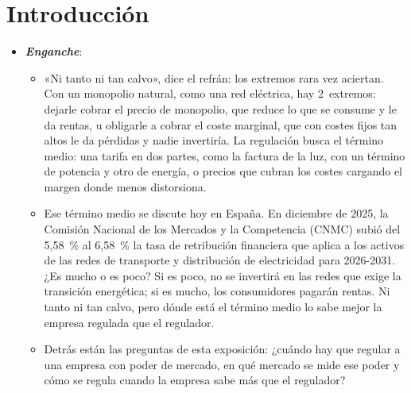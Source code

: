 \documentclass[11pt]{article}
\begin{document}
\tceetitulo

\section*{Introducción}

\begin{itemize}
\item \textbf{\emph{Enganche}}:
  \begin{itemize}
  \item «Ni tanto ni tan calvo», dice el refrán: los extremos rara vez aciertan. Con un monopolio natural, como una red eléctrica, hay 2~extremos: dejarle cobrar el precio de monopolio, que reduce lo que se consume y le da rentas, u obligarle a cobrar el coste marginal, que con costes fijos tan altos le da pérdidas y nadie invertiría. La regulación busca el término medio: una tarifa en dos partes, como la factura de la luz, con un término de potencia y otro de energía, o precios que cubran los costes cargando el margen donde menos distorsiona.
  \item Ese término medio se discute hoy en España. En diciembre de 2025, la Comisión Nacional de los Mercados y la Competencia (CNMC) subió del 5,58~\% al 6,58~\% la tasa de retribución financiera que aplica a los activos de las redes de transporte y distribución de electricidad para 2026-2031\nocite{CNMC2025Circular9,CNMC2025NPCirculares}. ¿Es mucho o es poco? Si es poco, no se invertirá en las redes que exige la transición energética; si es mucho, los consumidores pagarán rentas. Ni tanto ni tan calvo, pero dónde está el término medio lo sabe mejor la empresa regulada que el regulador.
  \item Detrás están las preguntas de esta exposición: ¿cuándo hay que regular a una empresa con poder de mercado, en qué mercado se mide ese poder y cómo se regula cuando la empresa sabe más que el regulador?
  \end{itemize}


\end{itemize}
\end{document}
